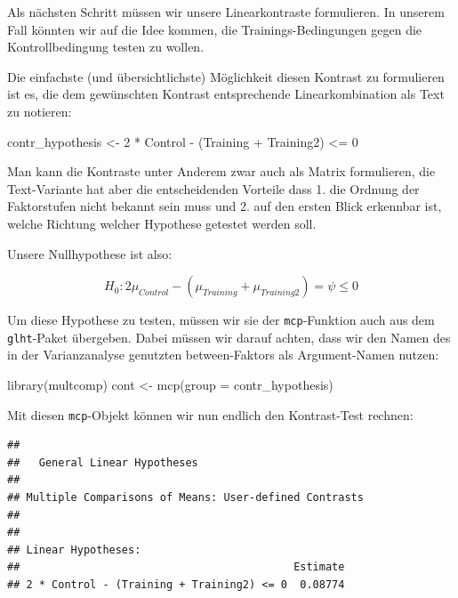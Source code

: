 \documentclass[
]{book}
\newenvironment{Shaded}{\begin{snugshade}}{\end{snugshade}}
\newcommand{\AttributeTok}[1]{\textcolor[rgb]{0.77,0.63,0.00}{#1}}
\newcommand{\FunctionTok}[1]{\textcolor[rgb]{0.00,0.00,0.00}{#1}}
\newcommand{\NormalTok}[1]{#1}
\newcommand{\OtherTok}[1]{\textcolor[rgb]{0.56,0.35,0.01}{#1}}
\newcommand{\SpecialCharTok}[1]{\textcolor[rgb]{0.00,0.00,0.00}{#1}}
\newcommand{\StringTok}[1]{\textcolor[rgb]{0.31,0.60,0.02}{#1}}
\begin{document}
Als nächsten Schritt müssen wir unsere Linearkontraste formulieren. In unserem Fall könnten wir auf die Idee kommen, die Trainings-Bedingungen gegen die Kontrollbedingung testen zu wollen.

Die einfachste (und übersichtlichste) Möglichkeit diesen Kontrast zu formulieren ist es, die dem gewünschten Kontrast entsprechende Linearkombination als Text zu notieren:

\begin{Shaded}
\begin{Highlighting}[]
\NormalTok{contr\_hypothesis }\OtherTok{\textless{}{-}} \StringTok{\textquotesingle{}2 * Control {-} (Training + Training2) \textless{}= 0\textquotesingle{}}
\end{Highlighting}
\end{Shaded}

Man kann die Kontraste unter Anderem zwar auch als Matrix formulieren, die Text-Variante hat aber die entscheidenden Vorteile dass 1. die Ordnung der Faktorstufen nicht bekannt sein muss und 2. auf den ersten Blick erkennbar ist, welche Richtung welcher Hypothese getestet werden soll.

Unsere Nullhypothese ist also:

\[H_0: 2\mu_{Control} - (\mu_{Training} + \mu_{Training2}) = \psi \leq 0\]

Um diese Hypothese zu testen, müssen wir sie der \texttt{mcp}-Funktion auch aus dem \texttt{glht}-Paket übergeben. Dabei müssen wir darauf achten, dass wir den Namen des in der Varianzanalyse genutzten between-Faktors als Argument-Namen nutzen:

\begin{Shaded}
\begin{Highlighting}[]
\FunctionTok{library}\NormalTok{(multcomp)}
\NormalTok{cont }\OtherTok{\textless{}{-}} \FunctionTok{mcp}\NormalTok{(}\AttributeTok{group =}\NormalTok{ contr\_hypothesis)}
\end{Highlighting}
\end{Shaded}

Mit diesen \texttt{mcp}-Objekt können wir nun endlich den Kontrast-Test rechnen:

\begin{Shaded}
\end{Shaded}

\begin{verbatim}
## 
##   General Linear Hypotheses
## 
## Multiple Comparisons of Means: User-defined Contrasts
## 
## 
## Linear Hypotheses:
##                                           Estimate
## 2 * Control - (Training + Training2) <= 0  0.08774
\end{verbatim}
\end{document}
